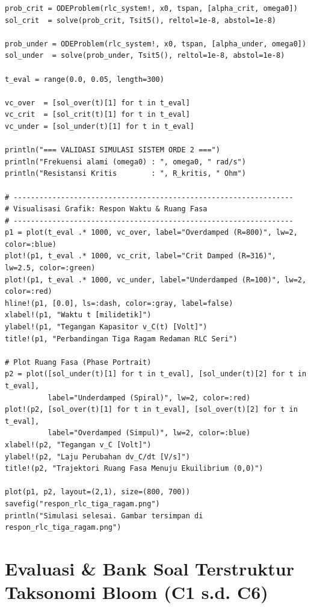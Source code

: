 \documentclass[11pt,a4paper]{article}
\theoremstyle{definition}
\begin{document}
\begin{lstlisting}[style=juliastyle, caption={Simulasi Tiga Ragam Redaman RLC dan Ruang Fasa dengan Julia.}, label={lst:julia_rlc_sim}]
prob_crit = ODEProblem(rlc_system!, x0, tspan, [alpha_crit, omega0])
sol_crit  = solve(prob_crit, Tsit5(), reltol=1e-8, abstol=1e-8)

prob_under = ODEProblem(rlc_system!, x0, tspan, [alpha_under, omega0])
sol_under  = solve(prob_under, Tsit5(), reltol=1e-8, abstol=1e-8)

t_eval = range(0.0, 0.05, length=300)

vc_over  = [sol_over(t)[1] for t in t_eval]
vc_crit  = [sol_crit(t)[1] for t in t_eval]
vc_under = [sol_under(t)[1] for t in t_eval]

println("=== VALIDASI SIMULASI SISTEM ORDE 2 ===")
println("Frekuensi alami (omega0) : ", omega0, " rad/s")
println("Resistansi Kritis        : ", R_kritis, " Ohm")

# -----------------------------------------------------------------
# Visualisasi Grafik: Respon Waktu & Ruang Fasa
# -----------------------------------------------------------------
p1 = plot(t_eval .* 1000, vc_over, label="Overdamped (R=800)", lw=2, color=:blue)
plot!(p1, t_eval .* 1000, vc_crit, label="Crit Damped (R=316)", lw=2.5, color=:green)
plot!(p1, t_eval .* 1000, vc_under, label="Underdamped (R=100)", lw=2, color=:red)
hline!(p1, [0.0], ls=:dash, color=:gray, label=false)
xlabel!(p1, "Waktu t [milidetik]")
ylabel!(p1, "Tegangan Kapasitor v_C(t) [Volt]")
title!(p1, "Perbandingan Tiga Ragam Redaman RLC Seri")

# Plot Ruang Fasa (Phase Portrait)
p2 = plot([sol_under(t)[1] for t in t_eval], [sol_under(t)[2] for t in t_eval],
          label="Underdamped (Spiral)", lw=2, color=:red)
plot!(p2, [sol_over(t)[1] for t in t_eval], [sol_over(t)[2] for t in t_eval],
          label="Overdamped (Simpul)", lw=2, color=:blue)
xlabel!(p2, "Tegangan v_C [Volt]")
ylabel!(p2, "Laju Perubahan dv_C/dt [V/s]")
title!(p2, "Trajektori Ruang Fasa Menuju Ekuilibrium (0,0)")

plot(p1, p2, layout=(2,1), size=(800, 700))
savefig("respon_rlc_tiga_ragam.png")
println("Simulasi selesai. Gambar tersimpan di respon_rlc_tiga_ragam.png")
\end{lstlisting}

\section{Evaluasi \& Bank Soal Terstruktur Taksonomi Bloom (C1 s.d. C6)}
\end{document}
